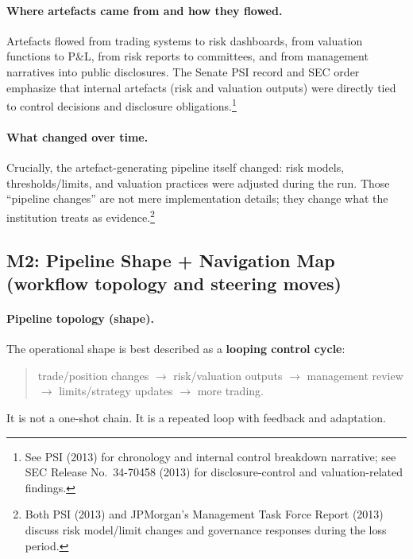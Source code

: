 \paragraph{Where artefacts came from and how they flowed.}
Artefacts flowed from trading systems to risk dashboards, from valuation functions to P\&L, from risk reports to committees, and from management narratives into public disclosures. The Senate PSI record and SEC order emphasize that internal artefacts (risk and valuation outputs) were directly tied to control decisions and disclosure obligations.\footnote{See PSI (2013) for chronology and internal control breakdown narrative; see SEC Release No.\ 34-70458 (2013) for disclosure-control and valuation-related findings.}

\paragraph{What changed over time.}
Crucially, the artefact-generating pipeline itself changed: risk models, thresholds/limits, and valuation practices were adjusted during the run. Those “pipeline changes” are not mere implementation details; they change what the institution treats as evidence.\footnote{Both PSI (2013) and JPMorgan’s Management Task Force Report (2013) discuss risk model/limit changes and governance responses during the loss period.}

\subsection{M2: Pipeline Shape + Navigation Map (workflow topology and steering moves)}
\label{subsec:lw-m2}

\paragraph{Pipeline topology (shape).}
The operational shape is best described as a \textbf{looping control cycle}:
\begin{quote}
trade/position changes $\rightarrow$ risk/valuation outputs $\rightarrow$ management review $\rightarrow$ limits/strategy updates $\rightarrow$ more trading.
\end{quote}
It is not a one-shot chain. It is a repeated loop with feedback and adaptation.


